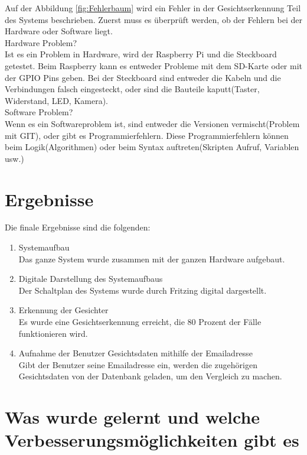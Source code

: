 	Auf der Abbildung \ref{fig:Fehlerbaum} wird ein Fehler in der Gesichtserkennung Teil des Systems beschrieben. Zuerst muss es überprüft werden, ob der Fehlern bei der Hardware oder Software liegt.\\
	
	Hardware Problem?\\
	Ist es ein Problem in Hardware, wird der Raspberry Pi und die Steckboard getestet. Beim Raspberry kann es entweder Probleme mit dem SD-Karte oder mit der GPIO Pins geben. Bei der Steckboard sind entweder die Kabeln und die Verbindungen falsch eingesteckt, oder sind die Bauteile kaputt(Taster, Widerstand, LED, Kamera).\\
	
	Software Problem?\\
	Wenn es ein Softwareproblem ist, sind entweder die Versionen vermischt(Problem mit GIT), oder gibt es Programmierfehlern. Diese Programmierfehlern können beim Logik(Algorithmen) oder beim Syntax auftreten(Skripten Aufruf, Variablen usw.)
	
	\section{Ergebnisse}
	Die finale Ergebnisse sind die folgenden:\\
	\begin{enumerate}
		\item Systemaufbau \\
		Das ganze System wurde zusammen mit der ganzen Hardware aufgebaut.
		\item Digitale Darstellung des Systemaufbaus\\
		Der Schaltplan des Systems wurde durch Fritzing digital dargestellt.
		\item Erkennung der Gesichter \\
		Es wurde eine Gesichtserkennung erreicht, die 80 Prozent der Fälle funktionieren wird.
		\item Aufnahme der Benutzer Gesichtsdaten mithilfe der Emailadresse\\
		Gibt der Benutzer seine Emailadresse ein, werden die zugehörigen Gesichtsdaten von der Datenbank geladen, um den Vergleich zu machen.
	\end{enumerate}

\section{Was wurde gelernt und welche Verbesserungsmöglichkeiten gibt es}


